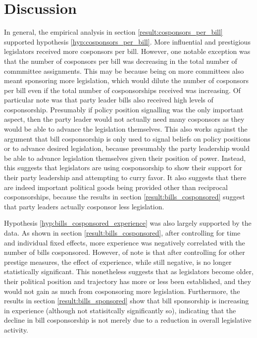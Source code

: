 \documentclass{article}
\begin{document}
  \section{Discussion}
  In general, the empirical analysis in section \ref{result:cosponsors_per_bill} supported hypothesis \ref{hyp:cosponsors_per_bill}. More influential and prestigious legislators received more cosponsors per bill. However, one notable exception was that the number of cosponsors per bill was decreasing in the total number of commmittee assignments. This may be because being on more committees also meant sponsoring more legislation, which would dilute the number of cosponsors per bill even if the total number of cosponsorships received was increasing. Of particular note was that party leader bills also received high levels of cosponsorship. Presumably if policy position signalling was the only important aspect, then the party leader would not actually need many cosponsors as they would be able to advance the legislation themselves. This also works against the argument that bill cosponsorship is only used to signal beliefs on policy positions or to advance desired legislation, because presumably the party leadership would be able to advance legislation themselves given their position of power. Instead, this suggests that legislators are using cosponsorship to show their support for their party leadership and attempting to curry favor. It also suggests that there are indeed important political goods being provided other than reciprocal cosponsorships, because the results in section \ref{result:bills_cosponsored} suggest that party leaders actually cosponsor less legislation. 

  Hypothesis \ref{hyp:bills_cosponsored_experience} was also largely supported by the data. As shown in section \ref{result:bills_cosponsored}, after controlling for time and individual fixed effects, more experience was negatively correlated with the number of bills cosponsored. However, of note is that after controlling for other prestige measures, the effect of experience, while still negative, is no longer statistically significant. This nonetheless suggests that as legislators become older, their political position and trajectory has more or less been established, and they would not gain as much from cosponsoring more legislation. Furthermore, the results in section \ref{result:bills_sponsored} show that bill sponsorship is increasing in experience (although not statisitcally significantly so), indicating that the decline in bill cosponsorship is not merely due to a reduction in overall legislative activity. 
\end{document}
